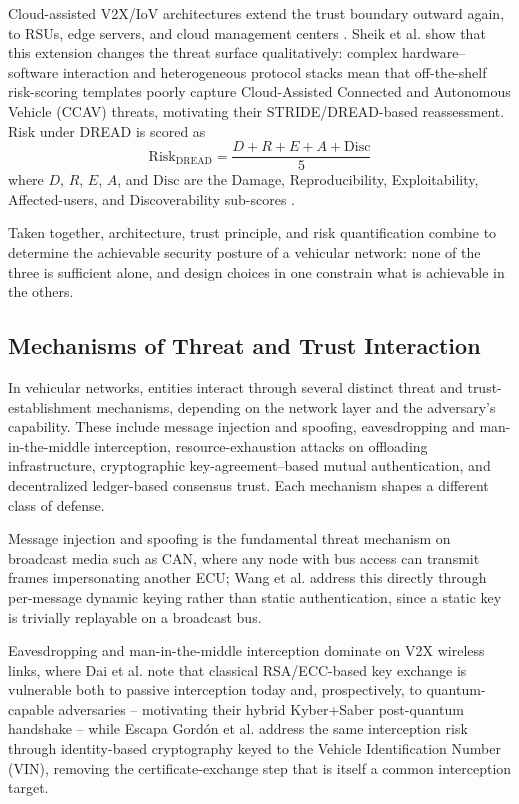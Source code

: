 \documentclass[journal]{IEEEtran}
\begin{document}
	Cloud-assisted V2X/IoV architectures extend the trust boundary outward
	again, to RSUs, edge servers, and cloud management centers
	\cite{ref13,ref14,ref15,ref16,ref17,ref18,ref19,ref20}. Sheik et al.
	\cite{ref30} show that this extension changes the threat surface
	qualitatively: complex hardware--software interaction and
	heterogeneous protocol stacks mean that off-the-shelf risk-scoring
	templates poorly capture Cloud-Assisted Connected and Autonomous
	Vehicle (CCAV) threats, motivating their STRIDE/DREAD-based
	reassessment. Risk under DREAD is scored as
	\begin{equation}
		\mathrm{Risk}_{\mathrm{DREAD}} = \frac{D + R + E + A + \mathrm{Disc}}{5}
		\label{eq:dread}
	\end{equation}
	where $D$, $R$, $E$, $A$, and $\mathrm{Disc}$ are the Damage,
	Reproducibility, Exploitability, Affected-users, and Discoverability
	sub-scores \cite{ref30}.
	
	Taken together, architecture, trust principle, and risk quantification
	combine to determine the achievable security posture of a vehicular
	network: none of the three is sufficient alone, and design choices in
	one constrain what is achievable in the others.
	
	\subsection{Mechanisms of Threat and Trust Interaction}
	
	In vehicular networks, entities interact through several distinct
	threat and trust-establishment mechanisms, depending on the network
	layer and the adversary's capability. These include message injection
	and spoofing, eavesdropping and man-in-the-middle interception,
	resource-exhaustion attacks on offloading infrastructure, cryptographic
	key-agreement--based mutual authentication, and decentralized
	ledger-based consensus trust. Each mechanism shapes a different class
	of defense.
	
	Message injection and spoofing is the fundamental threat mechanism on
	broadcast media such as CAN, where any node with bus access can
	transmit frames impersonating another ECU; Wang et al. \cite{ref21}
	address this directly through per-message dynamic keying rather than
	static authentication, since a static key is trivially replayable on a
	broadcast bus.
	
	Eavesdropping and man-in-the-middle interception dominate on V2X
	wireless links, where Dai et al. \cite{ref13} note that classical
	RSA/ECC-based key exchange is vulnerable both to passive interception
	today and, prospectively, to quantum-capable adversaries --
	motivating their hybrid Kyber+Saber post-quantum handshake -- while
	Escapa Gord\'on et al. \cite{ref15} address the same interception risk
	through identity-based cryptography keyed to the Vehicle Identification
	Number (VIN), removing the certificate-exchange step that is itself a
	common interception target.
	
\end{document}
